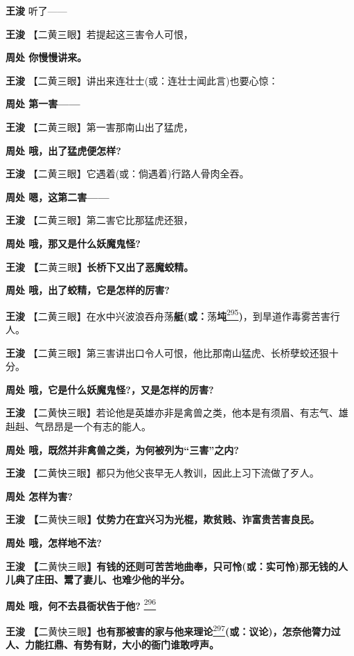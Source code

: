 \textbf{王浚} 听了------

\textbf{王浚} 【二黄三眼】若提起这三害令人可恨，

\textbf{周处 你慢慢讲来。}

\textbf{王浚} 【二黄三眼】讲出来连壮士(或：连壮士闻此言)也要心惊：

\textbf{周处 第一害------}

\textbf{王浚} 【二黄三眼】第一害那南山出了猛虎，

\textbf{周处 哦，出了猛虎便怎样?}

\textbf{王浚} 【二黄三眼】它遇着(或：倘遇着)行路人骨肉全吞。

\textbf{周处 嗯，这第二害------}

\textbf{王浚} 【二黄三眼】第二害它比那猛虎还狠，

\textbf{周处 哦，那又是什么妖魔鬼怪?}

\textbf{王浚 【}二黄三眼\textbf{】长桥下又出了恶魔蛟精。}

\textbf{周处 哦，出了蛟精，它是怎样的厉害?}

\textbf{王浚}
【二黄三眼】在水中兴波浪吞舟荡\textbf{艇(或：}荡\textbf{坉}\protect\hyperlink{fn295}{\textsuperscript{295}}\textbf{)}，到旱道作毒雾苦害行人。

\textbf{王浚}
【二黄三眼】第三害讲出口令人可恨，他比那南山猛虎、长桥孽蛟还狠十分。

\textbf{周处 哦，它是什么妖魔鬼怪?，又是怎样的厉害?}

\textbf{王浚}
【二黄快三眼】若论他是英雄亦非是禽兽之类，他本是有须眉、有志气、雄赳赳、气昂昂是一个有志的能人。

\textbf{周处 哦，既然并非禽兽之类，为何被列为``三害''之内?}

\textbf{王浚}
【二黄快三眼】都只为他父丧早无人教训，因此上习下流做了歹人。

\textbf{周处 怎样为害?}

\textbf{王浚
【}二黄快三眼\textbf{】仗势力在宜兴习为光棍，欺贫贱、诈富贵苦害良民。}

\textbf{周处 哦，怎样地不法?}

\textbf{王浚
【}二黄快三眼\textbf{】有钱的还则可苦苦地曲奉，只可怜(或：实可怜)那无钱的人儿典了庄田、鬻了妻儿、也难少他的半分。}

\textbf{周处 哦，何不去县衙状告于他?}
\protect\hyperlink{fn296}{\textsuperscript{296}}

\textbf{王浚
【}二黄快三眼\textbf{】也有那被害的家与他来理论}\protect\hyperlink{fn297}{\textsuperscript{297}}\textbf{(或：议论)，怎奈他膂力过人、力能扛鼎、有势有财，大小的衙门谁敢哼声。}

